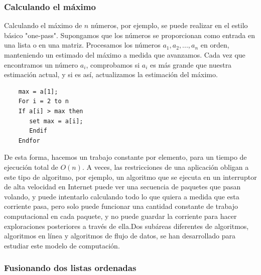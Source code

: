 \documentclass[a4paper]{article}
\begin{document}
\subsubsection*{Calculando el máximo}

Calculando el máximo de $n$ números, por ejemplo, se puede realizar en el estilo básico "one-pass". Supongamos que los números se proporcionan como entrada en una lista o en una matriz. Procesamos los números $a_1, a_2,. . ., a_n$ en orden, manteniendo un estimado del máximo a medida que avanzamos. Cada vez que encontramos un número $a_i$, comprobamos si $a_i$ es más grande que nuestra estimación actual, y si es así, actualizamos la estimación del máximo.\\


\begin{lstlisting}
	max = a[1];
	For i = 2 to n
	If a[i] > max then
	   set max = a[i];
	   Endif
	Endfor
\end{lstlisting}

De esta forma, hacemos un trabajo constante por elemento, para un tiempo de ejecución total de $O(n)$. A veces, las restricciones de una aplicación obligan a este tipo de algoritmo, por ejemplo, un algoritmo que se ejecuta en un interruptor de alta velocidad en Internet puede ver una secuencia de paquetes que pasan volando, y puede intentarlo calculando todo lo que quiera a medida que esta corriente pasa, pero solo puede funcionar una cantidad constante de trabajo computacional en cada paquete, y no puede guardar la corriente para hacer exploraciones posteriores a través de ella.Dos subáreas diferentes de algoritmos, algoritmos en línea y algoritmos de flujo de datos, se han desarrollado para estudiar este modelo de computación.\\

\subsubsection*{Fusionando dos listas ordenadas}
\end{document}
